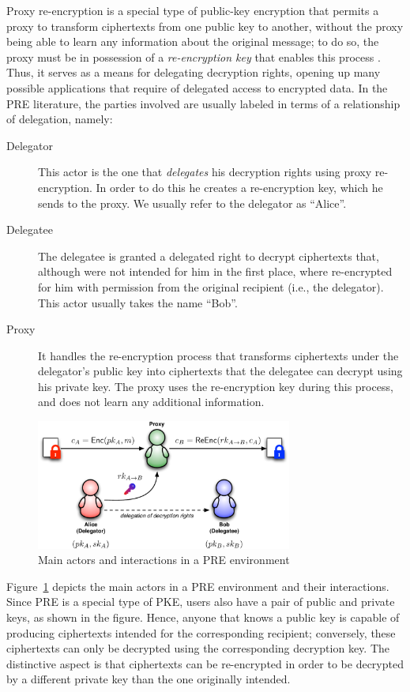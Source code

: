 \documentclass{amsart}
\begin{document}
Proxy re-encryption is a special type of public-key encryption that permits a proxy to transform ciphertexts from one public key to another, without the proxy being able to learn any information about the original message; to do so, the proxy must be in possession of a \emph{re-encryption key} that enables this process \cite{nunez2017proxy}. Thus, it serves as a means for delegating decryption rights, opening up many possible applications that require of delegated access to encrypted data. In the PRE literature, the parties involved are usually labeled in terms of a relationship of delegation, namely: %
\begin{description}
\item[Delegator] This actor is the one that \emph{delegates} his decryption rights using proxy re-encryption. In order to do this he creates a re-encryption key, which he sends to the proxy. We usually refer to the delegator as ``Alice''.
\item[Delegatee] The delegatee is granted a delegated right to decrypt ciphertexts that, although were not intended for him in the first place, where re-encrypted for him with permission from the original recipient (i.e., the delegator). This actor usually takes the name ``Bob''.
\item[Proxy] It handles the re-encryption process that transforms ciphertexts under the delegator's public key into ciphertexts that the delegatee can decrypt using his private key. The proxy uses the re-encryption key during this process, and does not learn any additional information. 
\end{description}

\begin{figure}%
\centering
\includegraphics[width=0.75\textwidth]{figures/pre.pdf}
\caption{Main actors and interactions in a PRE environment}
\label{fig:pre-actores}
\end{figure}

Figure~\ref{fig:pre-actores} depicts the main actors in a PRE environment and their interactions. Since PRE is a special type of PKE, users also have a pair of public and private keys, as shown in the figure. Hence, anyone that knows a public key is capable of producing ciphertexts intended for the corresponding recipient; conversely, these ciphertexts can only be decrypted using the corresponding decryption key. 
The distinctive aspect is that ciphertexts can be re-encrypted in order to be decrypted by a different private key than the one originally intended. 
\end{document}
